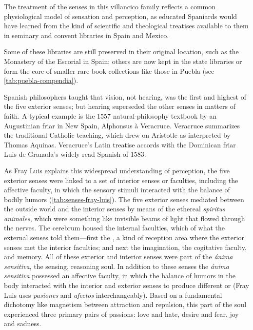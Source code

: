 The treatment of the senses in this villancico family reflects a common
physiological model of sensation and perception, as educated Spaniards would
have learned from the kind of scientific and theological treatises available to
them in seminary and convent libraries in Spain and Mexico.%
\begin{Footnote}
    Some of these libraries are still preserved in their original location, such
    as the Monastery of the Escorial in Spain; others are now kept in the state
    libraries or form the core of smaller rare-book collections like those in
    Puebla (see \cref{tab:puebla-compendia}).
\end{Footnote}
Spanish philosophers taught that vision, not hearing, was the first and highest
of the five exterior senses; but hearing superseded the other senses in matters
of faith.
A typical example is the 1557 natural-philosophy textbook  by an Augustinian friar in New Spain, Alphonsus à Veracruce.%
    \Autocite{Veracruce:Phisica}
Veracruce summarizes the traditional Catholic teaching, which drew on Aristotle
as interpreted by Thomas Aquinas.
Veracruce's Latin treatise accords with the Dominican friar Luis de Granada's
widely read Spanish  of 1583.%
    \Autocites{LuisdeGranada:Simbolo}{LuisdeGranada-Balcells:SimboloPtI}

As Fray Luis explains this widespread understanding of perception, the five
exterior senses were linked to a set of interior senses or faculties, including
the affective faculty, in which the sensory stimuli interacted with the balance
of bodily humors (\cref{tab:senses-fray-luis}).%
    \Autocite
    [, ]
    {LuisdeGranada-Balcells:SimboloPtI}
The five exterior senses mediated between the outside world and the interior
senses by means of the ethereal \emph{spiritus animales}, which were something
like invisible beams of light that flowed through the nerves.  
The cerebrum housed the internal faculties, which  of what
the external senses told them---first the , a kind of
reception area where the exterior senses met the interior faculties; and next
the imagination, the cogitative faculty, and memory.
All of these exterior and interior senses were part of the \emph{ánima
sensitiva}, the sensing, reasoning soul.
In addition to these senses the \emph{ánima sensitiva} possessed an affective
faculty, in which the balance of humors in the body interacted with the interior
and exterior senses to produce different  or 
(Fray Luis uses \emph{pasiones} and \emph{afectos} interchangeably).
Based on a fundamental dichotomy like magnetism between attraction and
repulsion, this  part of the soul experienced three
primary pairs of passions: love and hate, desire and fear, joy and sadness.

